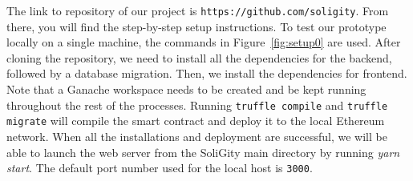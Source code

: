 \documentclass[12pt]{article}
\renewcommand{\_}{\kern-1.5pt\textunderscore\kern-1.5pt}
\begin{document}

The link to repository of our project is \texttt{https://github.com/soligity}. From there, you will find the step-by-step setup instructions. To test our prototype locally on a single machine, the commands in Figure~\ref{fig:setup0} are used. After cloning the repository, we need to install all the dependencies for the backend, followed by a database migration.  Then, we install the dependencies for frontend. Note that a Ganache workspace needs to be created and be kept running throughout the rest of the processes. Running \texttt{truffle compile} and \texttt{truffle migrate} will compile the smart contract and deploy it to the local Ethereum network. When all the installations and deployment are successful, we will be able to launch the web server from the SoliGity main directory by running \textit{yarn start}. The default port number used for the local host is \texttt{3000}. 
\end{document}
